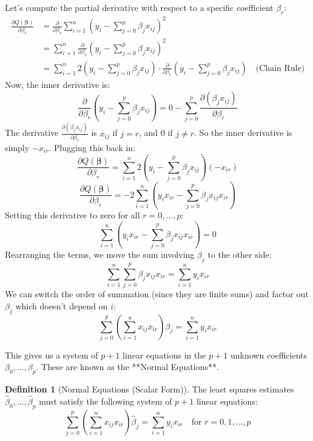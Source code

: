 \documentclass[11pt]{article}
\theoremstyle{definition}
\newtheorem{definition}[theorem]{Definition}
\begin{document}
Let's compute the partial derivative with respect to a specific coefficient $\beta_r$:
\begin{align*}
\frac{\partial Q(\boldsymbol{\beta})}{\partial \beta_r} &= \frac{\partial}{\partial \beta_r} \sum_{i=1}^{n} \left( y_i - \sum_{j=0}^{p} \beta_j x_{ij} \right)^2 \\
&= \sum_{i=1}^{n} \frac{\partial}{\partial \beta_r} \left( y_i - \sum_{j=0}^{p} \beta_j x_{ij} \right)^2 \\
&= \sum_{i=1}^{n} 2 \left( y_i - \sum_{j=0}^{p} \beta_j x_{ij} \right) \cdot \frac{\partial}{\partial \beta_r} \left( y_i - \sum_{j=0}^{p} \beta_j x_{ij} \right) \quad \text{(Chain Rule)}
\end{align*}
Now, the inner derivative is:
\[ \frac{\partial}{\partial \beta_r} \left( y_i - \sum_{j=0}^{p} \beta_j x_{ij} \right) = 0 - \sum_{j=0}^{p} \frac{\partial (\beta_j x_{ij})}{\partial \beta_r} \]
The derivative $\frac{\partial (\beta_j x_{ij})}{\partial \beta_r}$ is $x_{ij}$ if $j=r$, and 0 if $j \neq r$. So the inner derivative is simply $-x_{ir}$. Plugging this back in:
\[ \frac{\partial Q(\boldsymbol{\beta})}{\partial \beta_r} = \sum_{i=1}^{n} 2 \left( y_i - \sum_{j=0}^{p} \beta_j x_{ij} \right) (-x_{ir}) \]
\[ \frac{\partial Q(\boldsymbol{\beta})}{\partial \beta_r} = -2 \sum_{i=1}^{n} \left( y_i x_{ir} - \sum_{j=0}^{p} \beta_j x_{ij} x_{ir} \right) \]
Setting this derivative to zero for all $r = 0, \dots, p$:
\[ \sum_{i=1}^{n} \left( y_i x_{ir} - \sum_{j=0}^{p} \beta_j x_{ij} x_{ir} \right) = 0 \]
Rearranging the terms, we move the sum involving $\beta_j$ to the other side:
\[ \sum_{i=1}^{n} \sum_{j=0}^{p} \beta_j x_{ij} x_{ir} = \sum_{i=1}^{n} y_i x_{ir} \]
We can switch the order of summation (since they are finite sums) and factor out $\beta_j$ which doesn't depend on $i$:
\[ \sum_{j=0}^{p} \left( \sum_{i=1}^{n} x_{ij} x_{ir} \right) \beta_j = \sum_{i=1}^{n} y_i x_{ir} \]

This gives us a system of $p+1$ linear equations in the $p+1$ unknown coefficients $\beta_0, \dots, \beta_p$. These are known as the **Normal Equations**.

\begin{definition}[Normal Equations (Scalar Form)]
The least squares estimates $\hat{\beta}_0, \dots, \hat{\beta}_p$ must satisfy the following system of $p+1$ linear equations:
\[ \sum_{j=0}^{p} \left( \sum_{i=1}^{n} x_{ij} x_{ir} \right) \hat{\beta}_j = \sum_{i=1}^{n} y_i x_{ir} \quad \text{for } r = 0, 1, \dots, p \]
\end{definition}
\end{document}
